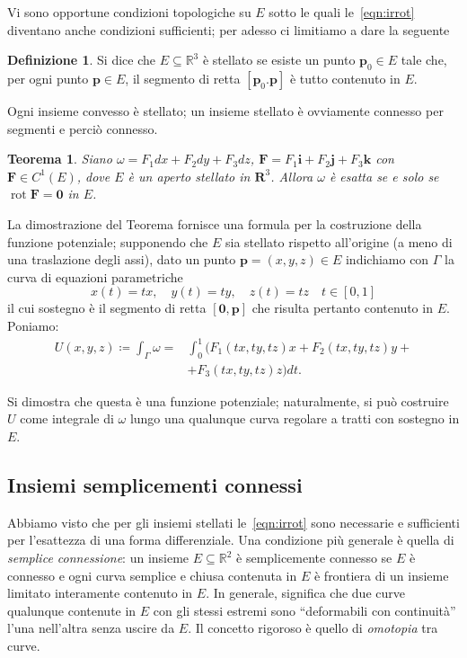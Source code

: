 \documentclass[a4paper]{book}
\DeclareMathOperator{\rot}{rot}
\numberwithin{equation}{section}
\theoremstyle{plain}
\newtheorem{teor}{Teorema}[section]
\theoremstyle{definition}
\newtheorem{defn}{Definizione}[section]
\theoremstyle{remark}
\renewcommand{\vec}{\boldsymbol}
\theoremstyle{example}
\begin{document}
Vi sono opportune condizioni topologiche su $E$ sotto le quali le~\eqref{eqn:irrot} diventano anche condizioni sufficienti; per adesso ci limitiamo a dare la seguente
	\begin{defn}
	Si dice che $E \subseteq \mathbb{R}^3$ è stellato se esiste un punto $\vec{p}_0 \in E$ tale che, per ogni punto $\vec{p} \in E$, il segmento di retta $[\vec{p}_0. \vec{p}]$ è tutto contenuto in $E$.
	\end{defn}

Ogni insieme convesso è stellato; un insieme stellato è ovviamente connesso per segmenti e perciò connesso.

\begin{teor}
Siano $\omega = F_1dx + F_2 dy + F_3 dz$, $\vec{F} = F_1\vec{i} + F_2\vec{j} + F_3\vec{k}$ con $\vec{F} \in C^1(E)$, dove $E$ è un aperto stellato in $\vec{R}^3$. Allora $\omega$ è esatta se e solo se $\rot{\vec{F}} = \vec{0}$ in $E$.
\end{teor}

La dimostrazione del Teorema fornisce una formula per la costruzione della funzione potenziale; supponendo che $E$ sia stellato rispetto all'origine (a meno di una traslazione degli assi), dato un punto $\vec{p} = (x, y, z) \in E$ indichiamo con $\Gamma$ la curva di equazioni parametriche
	\begin{equation*}
	x(t) = tx, \quad y(t) = ty, \quad z(t) = tz \quad t \in [0, 1]
	\end{equation*}
il cui sostegno è il segmento di retta $[\vec{0}, \vec{p}]$ che risulta pertanto contenuto in $E$. Poniamo:
	\begin{equation}
	\begin{split}
	U(x, y, z) \coloneqq \int_{\Gamma}\omega = &\int_0^1 (F_1(tx, ty, tz)x + F_2(tx, ty, tz)y + \\ &+ F_3(tx, ty, tz)z) dt.
	\end{split}
	\end{equation}

Si dimostra che questa è una funzione potenziale; naturalmente, si può costruire $U$ come integrale di $\omega$ lungo una qualunque curva regolare a tratti con sostegno in $E$.

\subsection{Insiemi semplicementi connessi}
Abbiamo visto che per gli insiemi stellati le~\eqref{eqn:irrot} sono necessarie e sufficienti per l'esattezza di una forma differenziale. Una condizione più generale è quella di \emph{semplice connessione}: un insieme $E \subseteq \mathbb{R}^2$ è semplicemente connesso se $E$ è connesso e ogni curva semplice e chiusa contenuta in $E$ è frontiera di un insieme limitato interamente contenuto in $E$. In generale, significa che due curve qualunque contenute in $E$ con gli stessi estremi sono ``deformabili con continuità''  l'una nell'altra senza uscire da $E$. Il concetto rigoroso è quello di \emph{omotopia} tra curve.
\end{document}
